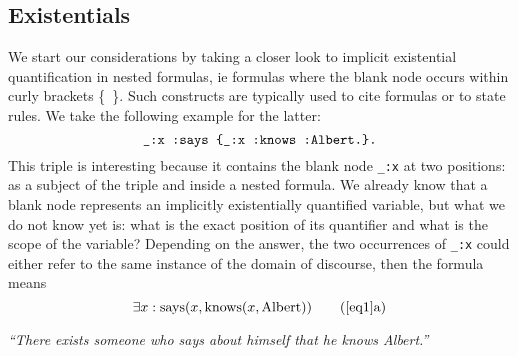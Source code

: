 \subsection{Existentials}\label{existentials}
We start our considerations by taking a closer look to implicit existential quantification in nested formulas, 
ie formulas where the blank node occurs within curly brackets \{~\}.  Such constructs are typically used to cite formulas or
to state rules. We take the following example for the latter:
% 
\begin{equation}\label{eq1}
\verb!_:x :says {_:x :knows :Albert.}.!
 \end{equation}
This triple is interesting because it contains the blank node \texttt{\_:x} at two positions: as a subject of the triple and inside a nested formula. We already know 
that a blank node represents an implicitly existentially quantified variable, but what we do not know yet is: what is the exact position of its quantifier 
and what is the scope of the variable? Depending on the answer, the two occurrences of \texttt{\_:x} could either refer to the same instance of the domain of discourse, 
then the formula means
%
\[\exists x : \text{says}(x, \text{knows}(x, \text{Albert})) \tag{\ref{eq1}a} \label{zwei}\]
\begin{center}\textit{``There exists someone who says about himself that he knows Albert.''}
  \end{center}
